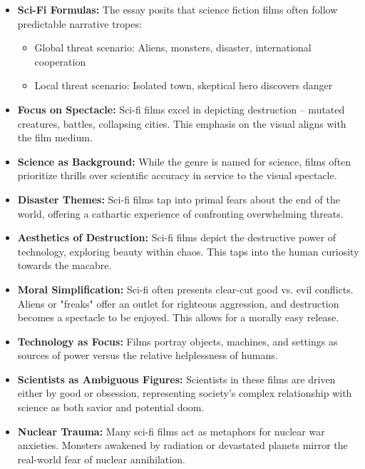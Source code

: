 \documentclass[11pt,fleqn]{book}
\begin{document}
\begin{itemize}
\item \textbf{Sci-Fi Formulas:}  The essay posits that science fiction films often follow predictable narrative tropes:
    \begin{itemize}
        \item Global threat scenario: Aliens, monsters, disaster, international cooperation 
        \item Local threat scenario: Isolated town, skeptical hero discovers danger 
    \end{itemize}

\item \textbf{Focus on Spectacle:} Sci-fi films excel in depicting destruction – mutated creatures, battles, collapsing cities. This emphasis on the visual aligns with the film medium.

\item \textbf{Science as Background:} While the genre is named for science, films often prioritize thrills over scientific accuracy in service to the visual spectacle.

\item \textbf{Disaster Themes:}  Sci-fi films tap into primal fears about the end of the world,  offering a cathartic experience of confronting overwhelming threats. 

\item \textbf{Aesthetics of Destruction:} Sci-fi films depict the destructive power of  technology, exploring beauty within chaos. This taps into the human curiosity towards the macabre.

\item \textbf{Moral Simplification:}  Sci-fi often presents clear-cut good vs. evil conflicts.  Aliens or "freaks" offer an outlet for righteous aggression, and destruction becomes a spectacle to be enjoyed.  This allows for a morally easy release.

\item \textbf{Technology as Focus:}  Films portray objects, machines, and settings as sources of power versus the relative helplessness of humans. 

\item \textbf{Scientists as Ambiguous Figures:} Scientists in these films are driven either by good or obsession, representing society's complex relationship with science as both savior and potential doom.

\item \textbf{Nuclear Trauma:}  Many sci-fi films act as metaphors for nuclear war anxieties. Monsters awakened by radiation or devastated planets mirror the real-world fear of nuclear annihilation.


\end{itemize}
\end{document}
